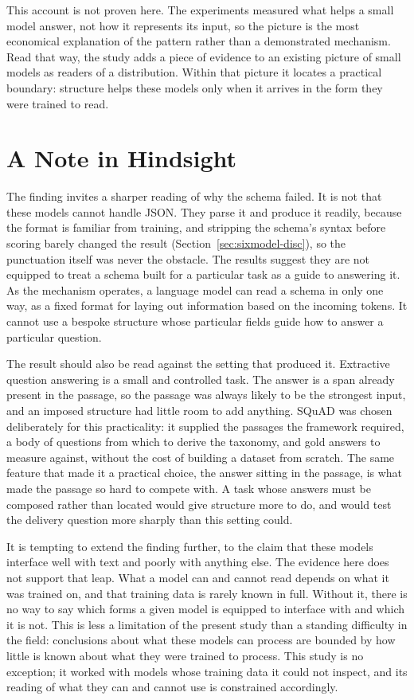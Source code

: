 \documentclass[master]{thesis}
\newcommand{\sref}[1]{Section~\ref{#1}}  %
\begin{document}
This account is not proven here. The experiments measured what helps a small model answer, not how it represents its input, so the picture is the most economical explanation of the pattern rather than a demonstrated mechanism. Read that way, the study adds a piece of evidence to an existing picture of small models as readers of a distribution. Within that picture it locates a practical boundary: structure helps these models only when it arrives in the form they were trained to read.

\section{A Note in Hindsight}

The finding invites a sharper reading of why the schema failed. It is not that these models cannot handle JSON. They parse it and produce it readily, because the format is familiar from training, and stripping the schema's syntax before scoring barely changed the result (\sref{sec:sixmodel-disc}), so the punctuation itself was never the obstacle. The results suggest they are not equipped to treat a schema built for a particular task as a guide to answering it. As the mechanism operates, a language model can read a schema in only one way, as a fixed format for laying out information based on the incoming tokens. It cannot use a bespoke structure whose particular fields guide how to answer a particular question.

The result should also be read against the setting that produced it. Extractive question answering is a small and controlled task. The answer is a span already present in the passage, so the passage was always likely to be the strongest input, and an imposed structure had little room to add anything. SQuAD was chosen deliberately for this practicality: it supplied the passages the framework required, a body of questions from which to derive the taxonomy, and gold answers to measure against, without the cost of building a dataset from scratch. The same feature that made it a practical choice, the answer sitting in the passage, is what made the passage so hard to compete with. A task whose answers must be composed rather than located would give structure more to do, and would test the delivery question more sharply than this setting could.

It is tempting to extend the finding further, to the claim that these models interface well with text and poorly with anything else. The evidence here does not support that leap. What a model can and cannot read depends on what it was trained on, and that training data is rarely known in full. Without it, there is no way to say which forms a given model is equipped to interface with and which it is not. This is less a limitation of the present study than a standing difficulty in the field: conclusions about what these models can process are bounded by how little is known about what they were trained to process. This study is no exception; it worked with models whose training data it could not inspect, and its reading of what they can and cannot use is constrained accordingly.
\end{document}
